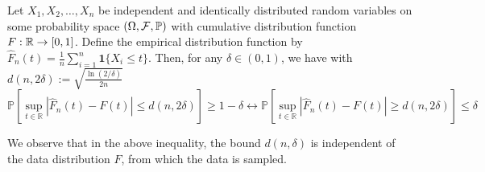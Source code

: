 \begin{lemma} \citet{massart1990tight}
\label{lem:DKW}
Let \(X_1, X_2, \dots, X_{n}\) be independent and identically distributed random variables on some probability space $(\Omega, \mathcal{F}, \mathbb{P})$ with cumulative distribution function \(F:\mathbb{R} \to [0,1]\). Define the empirical distribution function by $\widehat{F}_n(t) = \frac{1}{n} \sum_{i=1}^{n} \mathbf{1}\{X_i \le t\}.$
Then, for any   \(\delta \in (0,1)\),   we have with $d(n, 2\delta):=\sqrt{\frac{\ln(2/\delta)}{2n}}$ 
\[
\mathbb{P}\left[ \sup_{t \in \mathbb{R}} \left|\widehat{F}_n(t) - F(t)\right| \le d(n, 2\delta) \right] \geq 1-\delta \leftrightarrow \mathbb{P}\left[\sup_{t \in \mathbb{R}} \left|\widehat{F}_n(t) - F(t)\right| \geq d(n, 2\delta) \right] \leq \delta 
\]
\end{lemma}
\begin{remark}
  We observe that in the above inequality, the bound $d(n,\delta)$ is independent of the data distribution $F$, from which the data is sampled. 
\end{remark}

